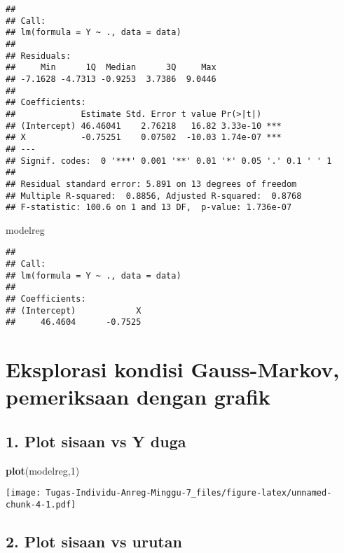 \documentclass[
]{article}
\newenvironment{Shaded}{\begin{snugshade}}{\end{snugshade}}
\newcommand{\DecValTok}[1]{\textcolor[rgb]{0.00,0.00,0.81}{#1}}
\newcommand{\FunctionTok}[1]{\textcolor[rgb]{0.13,0.29,0.53}{\textbf{#1}}}
\newcommand{\NormalTok}[1]{#1}
\begin{document}
\begin{verbatim}
## 
## Call:
## lm(formula = Y ~ ., data = data)
## 
## Residuals:
##     Min      1Q  Median      3Q     Max 
## -7.1628 -4.7313 -0.9253  3.7386  9.0446 
## 
## Coefficients:
##             Estimate Std. Error t value Pr(>|t|)    
## (Intercept) 46.46041    2.76218   16.82 3.33e-10 ***
## X           -0.75251    0.07502  -10.03 1.74e-07 ***
## ---
## Signif. codes:  0 '***' 0.001 '**' 0.01 '*' 0.05 '.' 0.1 ' ' 1
## 
## Residual standard error: 5.891 on 13 degrees of freedom
## Multiple R-squared:  0.8856, Adjusted R-squared:  0.8768 
## F-statistic: 100.6 on 1 and 13 DF,  p-value: 1.736e-07
\end{verbatim}

\begin{Shaded}
\begin{Highlighting}[]
\NormalTok{modelreg}
\end{Highlighting}
\end{Shaded}

\begin{verbatim}
## 
## Call:
## lm(formula = Y ~ ., data = data)
## 
## Coefficients:
## (Intercept)            X  
##     46.4604      -0.7525
\end{verbatim}

\hypertarget{eksplorasi-kondisi-gauss-markov-pemeriksaan-dengan-grafik}{%
\section{Eksplorasi kondisi Gauss-Markov, pemeriksaan dengan
grafik}\label{eksplorasi-kondisi-gauss-markov-pemeriksaan-dengan-grafik}}

\hypertarget{plot-sisaan-vs-y-duga}{%
\subsection{1. Plot sisaan vs Y duga}\label{plot-sisaan-vs-y-duga}}

\begin{Shaded}
\begin{Highlighting}[]
\FunctionTok{plot}\NormalTok{(modelreg,}\DecValTok{1}\NormalTok{)}
\end{Highlighting}
\end{Shaded}

\texttt{[image: Tugas-Individu-Anreg-Minggu-7\_files/figure-latex/unnamed-chunk-4-1.pdf]}

\hypertarget{plot-sisaan-vs-urutan}{%
\subsection{2. Plot sisaan vs urutan}\label{plot-sisaan-vs-urutan}}
\end{document}
